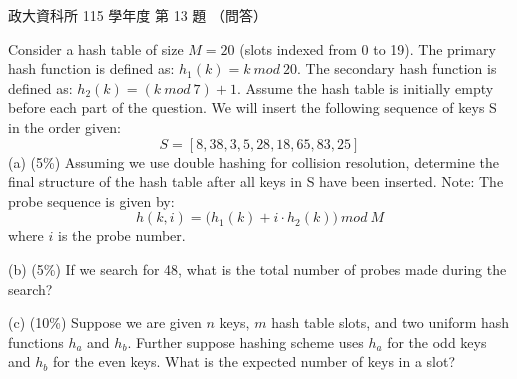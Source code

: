 \begin{pastexam}[label={px:nccu-115-dsa-13}]{政大資科所 115 學年度 第 13 題}
（問答）

Consider a hash table of size $M=20$ (slots indexed from 0 to 19). The primary hash function is defined as:
$h_1(k)=k \mathit{\ mod\ } 20$. The secondary hash function is defined as: $h_2(k)=(k \mathit{\ mod\ } 7)+1$.
Assume the hash table is initially empty before each part of the question. We will insert the following
sequence of keys S in the order given:
\[ S=[8,38,3,5,28,18,65,83,25] \]
(a) (5\%) Assuming we use double hashing for collision resolution, determine the final structure of the hash
table after all keys in S have been inserted. Note: The probe sequence is given by:
\[ h(k,i)=\big(h_1(k)+i\cdot h_2(k)\big) \mathit{\ mod\ } M \]
where $i$ is the probe number.

(b) (5\%) If we search for 48, what is the total number of probes made during the search?

(c) (10\%) Suppose we are given $n$ keys, $m$ hash table slots, and two uniform hash functions $h_a$ and
$h_b$. Further suppose hashing scheme uses $h_a$ for the odd keys and $h_b$ for the even keys. What is the
expected number of keys in a slot?
\end{pastexam}


